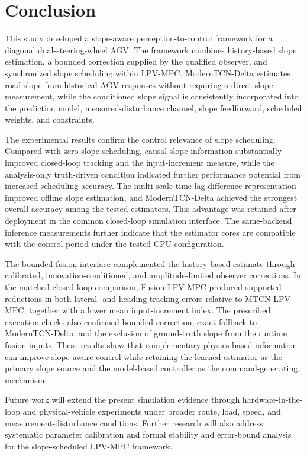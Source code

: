 \documentclass{ieeeaccess}
\begin{document}
\FloatBarrier
\section{Conclusion}
\label{sec:conclusion}

This study developed a slope-aware perception-to-control framework for a
diagonal dual-steering-wheel AGV. The framework combines history-based slope
estimation, a bounded correction supplied by the qualified observer, and
synchronized slope scheduling within LPV-MPC. ModernTCN-Delta estimates road
slope from historical AGV responses without requiring a direct slope
measurement, while the conditioned slope signal is consistently incorporated
into the prediction model, measured-disturbance channel, slope feedforward,
scheduled weights, and constraints.

The experimental results confirm the control relevance of slope scheduling.
Compared with zero-slope scheduling, causal slope information substantially
improved closed-loop tracking and the input-increment measure, while the
analysis-only truth-driven condition indicated further performance potential
from increased scheduling accuracy. The multi-scale time-lag difference representation
improved offline slope estimation, and ModernTCN-Delta achieved the strongest
overall accuracy among the tested estimators. This advantage was retained after
deployment in the common closed-loop simulation interface. The same-backend
inference measurements further indicate that the estimator cores are compatible
with the control period under the tested CPU configuration.

The bounded fusion interface complemented the history-based estimate through
calibrated, innovation-conditioned, and amplitude-limited observer corrections.
In the matched closed-loop comparison, Fusion-LPV-MPC produced supported
reductions in both lateral- and heading-tracking errors relative to
MTCN-LPV-MPC, together with a lower mean input-increment index. The prescribed
execution checks also confirmed bounded correction, exact fallback to
ModernTCN-Delta, and the exclusion of ground-truth slope from the runtime fusion
inputs. These results show that complementary physics-based information can
improve slope-aware control while retaining the learned estimator as the
primary slope source and the model-based controller as the command-generating
mechanism.

Future work will extend the present simulation evidence through
hardware-in-the-loop and physical-vehicle experiments under broader route,
load, speed, and measurement-disturbance conditions. Further research will also
address systematic parameter calibration and formal stability and error-bound
analysis for the slope-scheduled LPV-MPC framework.
\end{document}
